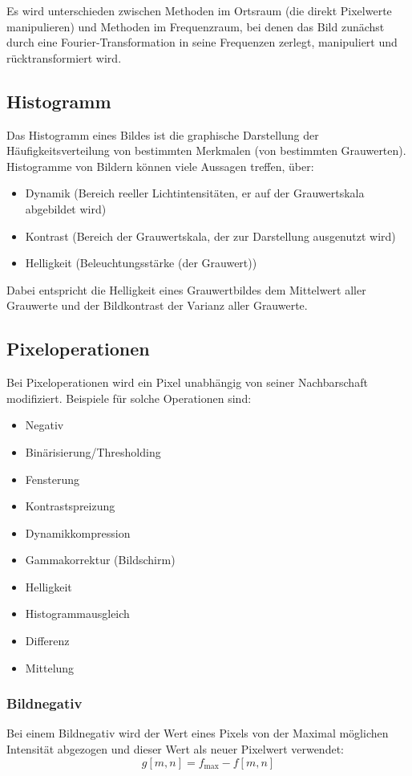 		Es wird unterschieden zwischen Methoden im Ortsraum (die direkt Pixelwerte manipulieren) und Methoden im Frequenzraum, bei denen das Bild zunächst durch eine Fourier-Transformation in seine Frequenzen zerlegt, manipuliert und rücktransformiert wird.

		\subsection{Histogramm}
			Das Histogramm eines Bildes ist die graphische Darstellung der Häufigkeitsverteilung von bestimmten Merkmalen (\zB von bestimmten Grauwerten). Histogramme von Bildern können viele Aussagen treffen, \zB über:
			\begin{itemize}
				\item Dynamik (Bereich reeller Lichtintensitäten, er auf der Grauwertskala abgebildet wird)
				\item Kontrast (Bereich der Grauwertskala, der zur Darstellung ausgenutzt wird)
				\item Helligkeit (Beleuchtungsstärke (der Grauwert))
			\end{itemize}
			Dabei entspricht die Helligkeit eines Grauwertbildes dem Mittelwert aller Grauwerte und der Bildkontrast der Varianz aller Grauwerte.

		\subsection{Pixeloperationen}
			Bei Pixeloperationen wird ein Pixel unabhängig von seiner Nachbarschaft modifiziert. Beispiele für solche Operationen sind:
			\begin{itemize}
				\item Negativ
				\item Binärisierung/Thresholding
				\item Fensterung
				\item Kontrastspreizung
				\item Dynamikkompression
				\item Gammakorrektur (Bildschirm)
				\item Helligkeit
				\item Histogrammausgleich
				\item Differenz
				\item Mittelung
			\end{itemize}

			\subsubsection{Bildnegativ}
				Bei einem Bildnegativ wird der Wert eines Pixels von der Maximal möglichen Intensität abgezogen und dieser Wert als neuer Pixelwert verwendet:
				\begin{equation*}
					g[m, n] = f_\text{max} - f[m, n]
				\end{equation*}

